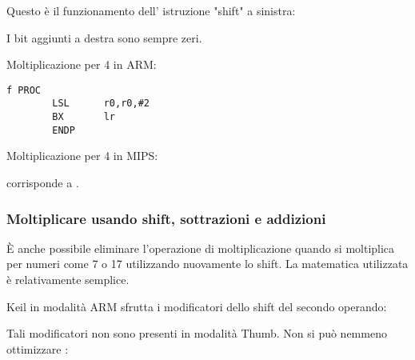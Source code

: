 Questo è il funzionamento dell' istruzione "shift" a sinistra:



I bit aggiunti a destra sono sempre zeri.

Moltiplicazione per 4 in ARM:

\begin{lstlisting}[caption=\NonOptimizingKeilVI (\ARMMode),style=customasmARM]
f PROC
        LSL      r0,r0,#2
        BX       lr
        ENDP
\end{lstlisting}

Moltiplicazione per 4 in MIPS:



 corrisponde a .

\subsubsection{Moltiplicare usando shift, sottrazioni e addizioni}
\label{multiplication_using_shifts_adds_subs}

È anche  possibile eliminare l'operazione di moltiplicazione quando si moltiplica  per numeri come 
7 o 17 utilizzando nuovamente lo shift.
La matematica utilizzata è relativamente semplice.








Keil in modalità ARM sfrutta i modificatori dello shift del secondo operando:



Tali modificatori non sono presenti in modalità Thumb.
Non si può nemmeno ottimizzare :



